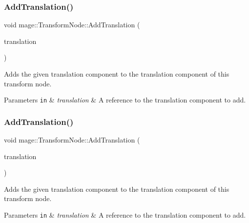 \subsubsection{\texorpdfstring{Add\+Translation()}{AddTranslation()}\hspace{0.1cm}{\footnotesize\ttfamily [2/3]}}
{\footnotesize\ttfamily void mage\+::\+Transform\+Node\+::\+Add\+Translation (\begin{DoxyParamCaption}\item[{const X\+M\+F\+L\+O\+A\+T3 \&}]{translation }\end{DoxyParamCaption})}

Adds the given translation component to the translation component of this transform node.


\begin{DoxyParams}[1]{Parameters}
\mbox{\tt in}  & {\em translation} & A reference to the translation component to add. \\
\hline
\end{DoxyParams}
\hypertarget{classmage_1_1_transform_node_ae2f57eb9e02583900f865e80040279b4}{}\label{classmage_1_1_transform_node_ae2f57eb9e02583900f865e80040279b4} 
\subsubsection{\texorpdfstring{Add\+Translation()}{AddTranslation()}\hspace{0.1cm}{\footnotesize\ttfamily [3/3]}}
{\footnotesize\ttfamily void mage\+::\+Transform\+Node\+::\+Add\+Translation (\begin{DoxyParamCaption}\item[{const X\+M\+V\+E\+C\+T\+OR \&}]{translation }\end{DoxyParamCaption})}

Adds the given translation component to the translation component of this transform node.


\begin{DoxyParams}[1]{Parameters}
\mbox{\tt in}  & {\em translation} & A reference to the translation component to add. \\
\hline
\end{DoxyParams}
\hypertarget{classmage_1_1_transform_node_a16f2077647c4a0f7f1f27e11ba7dbf37}{}\label{classmage_1_1_transform_node_a16f2077647c4a0f7f1f27e11ba7dbf37} 
